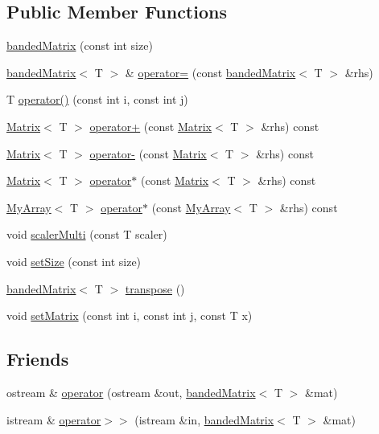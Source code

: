 \subsection*{Public Member Functions}
\begin{DoxyCompactItemize}
\item 
\hyperlink{classbandedMatrix_a8a48b85c55ed7f4055e154600b0b50da}{banded\+Matrix} (const int size)
\item 
\hyperlink{classbandedMatrix}{banded\+Matrix}$<$ T $>$ \& \hyperlink{classbandedMatrix_aa4fd78d89e813451ca8567a89d548d82}{operator=} (const \hyperlink{classbandedMatrix}{banded\+Matrix}$<$ T $>$ \&rhs)
\item 
T \hyperlink{classbandedMatrix_ab409014ecb4a94ea53382d2eece20019}{operator()} (const int i, const int j)
\item 
\hyperlink{classMatrix}{Matrix}$<$ T $>$ \hyperlink{classbandedMatrix_a4d364d109a141351074d1e09691e4660}{operator+} (const \hyperlink{classMatrix}{Matrix}$<$ T $>$ \&rhs) const 
\item 
\hyperlink{classMatrix}{Matrix}$<$ T $>$ \hyperlink{classbandedMatrix_aa8262d21e509569c3a42894149fe24a4}{operator-\/} (const \hyperlink{classMatrix}{Matrix}$<$ T $>$ \&rhs) const 
\item 
\hyperlink{classMatrix}{Matrix}$<$ T $>$ \hyperlink{classbandedMatrix_a9692d4b7a37887a28801c1e058127e2f}{operator$\ast$} (const \hyperlink{classMatrix}{Matrix}$<$ T $>$ \&rhs) const 
\item 
\hyperlink{classMyArray}{My\+Array}$<$ T $>$ \hyperlink{classbandedMatrix_aa2ac54b2d447a8a73f8801cec81ccc8d}{operator$\ast$} (const \hyperlink{classMyArray}{My\+Array}$<$ T $>$ \&rhs) const 
\item 
void \hyperlink{classbandedMatrix_aea6df1bb2a0e8aee24666ced43c6b43e}{scaler\+Multi} (const T scaler)
\item 
void \hyperlink{classbandedMatrix_a633408c224f60b8190e74f86e4c968bd}{set\+Size} (const int size)
\item 
\hyperlink{classbandedMatrix}{banded\+Matrix}$<$ T $>$ \hyperlink{classbandedMatrix_a18b7f71042a3d584b7be2e67962f1b8d}{transpose} ()
\item 
void \hyperlink{classbandedMatrix_abf0098be065238b55c7f6f95d74ababc}{set\+Matrix} (const int i, const int j, const T x)
\end{DoxyCompactItemize}
\subsection*{Friends}
\begin{DoxyCompactItemize}
\item 
ostream \& \hyperlink{classbandedMatrix_a290503bc1ea998a99cfe3719beb75636}{operator} (ostream \&out, \hyperlink{classbandedMatrix}{banded\+Matrix}$<$ T $>$ \&mat)
\item 
istream \& \hyperlink{classbandedMatrix_ae44c208638c8b9f8d6e52ccf0ead1a7b}{operator$>$$>$} (istream \&in, \hyperlink{classbandedMatrix}{banded\+Matrix}$<$ T $>$ \&mat)
\end{DoxyCompactItemize}
